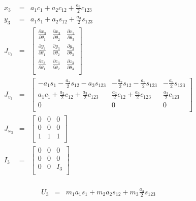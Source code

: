 \documentclass[a4paper]{article}
\begin{document}
\begin{eqnarray*}
x_3 & = & a_1 c_1 + a_2 c_{12} + \frac{a_3}{2}c_{123}\\
y_3 & = & a_1 s_1 + a_2 s_{12} + \frac{a_3}{2}s_{123}\\
J_{v_3} & = & \begin{bmatrix}
			  \frac{\partial x_3}{\partial \theta_1} & \frac{\partial x_3}{\partial \theta_2} & \frac{\partial x_3}{\partial \theta_3} \\
              \frac{\partial y_3}{\partial \theta_1} & \frac{\partial y_3}{\partial \theta_2} & \frac{\partial y_3}{\partial \theta_3} \\
              \frac{\partial z_3}{\partial \theta_1} & \frac{\partial z_3}{\partial \theta_2} & \frac{\partial z_3}{\partial \theta_3} \\
			  \end{bmatrix}\\
J_{v_3} & = & \begin{bmatrix}
			  -a_1s_1 -\frac{a_2}{2}s_{12} -a_3s_{123} & - \frac{a_2}{2} s_{12} -\frac{a_3}{2}s_{123} & -\frac{a_3}{2}s_{123}\\
              a_1 c_1 + \frac{a_2}{2}c_{12} + \frac{a_3}{2}c_{123} & \frac{a_2}{2}c_{12} + \frac{a_3}{2}c_{123}  & \frac{a_3}{2}c_{123} \\
              0 & 0 & 0\\
			  \end{bmatrix}\\
J_{\omega_3} & = & \begin{bmatrix}
			  0 & 0 & 0\\
              0 & 0 & 0\\
              1 & 1 & 1\\
			  \end{bmatrix}\\
I_3 & = & \begin{bmatrix}
		  0 & 0 & 0\\
          0 & 0 & 0\\
          0 & 0 & I_3\\
	      \end{bmatrix}\\              
\end{eqnarray*}

\begin{eqnarray*}
U_3 & = & m_1 a_1 s_1 + m_2 a_2 s_{12} + m_3 \frac{a_3}{2}s_{123}\\
\end{eqnarray*}
\end{document}
